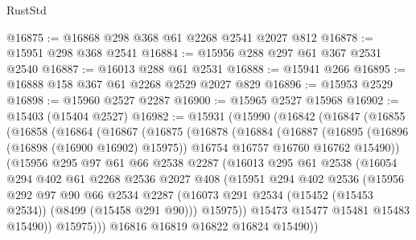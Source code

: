 \begin{lexlean}{RustStd}
\begin{coremodule}
@16875 := @16868 @298 @368 @61 @2268 @2541 @2027 @812
@16878 := @15951 @298 @368 @2541
@16884 := @15956 @288 @297 @61 @367 @2531 @2540
@16887 := @16013 @288 @61 @2531
@16888 := @15941 @266
@16895 := @16888 @158 @367 @61 @2268 @2529 @2027 @829
@16896 := @15953 @2529
@16898 := @15960 @2527 @2287
@16900 := @15965 @2527 @15968
@16902 := @15403 (@15404 @2527)
@16982 := @15931
    (@15990
      (@16842
        (@16847
          (@16855
            (@16858
              (@16864
                (@16867
                  (@16875
                    (@16878
                      (@16884
                        (@16887
                          (@16895
                            (@16896 (@16898 (@16900 @16902) @15975))
                            @16754
                            @16757
                            @16760
                            @16762
                            @15490))
                        (@15956
                          @295
                          @97
                          @61
                          @66
                          @2538
                          @2287
                          (@16013
                            @295
                            @61
                            @2538
                            (@16054
                              @294
                              @402
                              @61
                              @2268
                              @2536
                              @2027
                              @408
                              (@15951
                                @294
                                @402
                                @2536
                                (@15956
                                  @292
                                  @97
                                  @90
                                  @66
                                  @2534
                                  @2287
                                  (@16073
                                    @291
                                    @2534
                                    (@15452 (@15453 @2534))
                                    (@8499 (@15458 @291 @90)))
                                  @15975))
                              @15473
                              @15477
                              @15481
                              @15483
                              @15490))
                          @15975)))
                    @16816
                    @16819
                    @16822
                    @16824
                    @15490))

\end{coremodule}
\end{lexlean}
